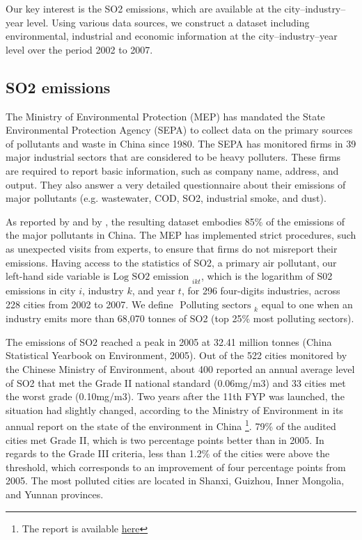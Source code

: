 \documentclass[12pt]{article}
\begin{document}
Our key interest is the SO2 emissions, which are available at the city–industry–year level. Using various data sources, we construct a dataset including environmental, industrial and economic information at the city–industry–year level over the period 2002 to 2007.

\subsection{SO2 emissions} \label{sec:so2}

The Ministry of Environmental Protection (MEP) has mandated the State Environmental Protection Agency (SEPA) to collect data on the primary sources of pollutants and waste in China since 1980. The SEPA has monitored firms in 39 major industrial sectors that are considered to be heavy polluters. These firms are required to report basic information, such as company name, address, and output. They also answer a very detailed questionnaire about their emissions of major pollutants (e.g. wastewater, COD, SO2, industrial smoke, and dust). 

As reported by \cite{Wu2017-bl} and by \cite{Jiang2014-pf}, the resulting dataset embodies 85\% of the emissions of the major pollutants in China. The MEP has implemented strict procedures, such as unexpected visits from experts, to ensure that firms do not misreport their emissions. Having access to the statistics of SO2, a primary air pollutant, our left-hand side variable is $\text {Log SO2 emission }_{i k t}$, which is the logarithm of S02 emissions in city $i$, industry $k$, and year $t$, for 296 four-digits industries, across 228 cities from 2002 to 2007. We define $\text {  Polluting sectors }_{k}$ equal to one when an industry emits more than 68,070 tonnes of SO2 (top 25\% most polluting sectors). 

The emissions of SO2 reached a peak in 2005 at 32.41 million tonnes (China Statistical Yearbook on Environment, 2005). Out of the 522 cities monitored by the Chinese Ministry of Environment, about 400 reported an annual average level of SO2 that met the Grade II national standard (0.06mg/m3) and 33 cities met the worst grade (0.10mg/m3). Two years after the 11th FYP was launched, the situation had slightly changed, according to the Ministry of Environment in its annual report on the state of the environment in China \footnote{The report is available \href{http://english.mee.gov.cn/Resources/Reports/soe/soe2007/201}{here}}. 79\% of the audited cities met Grade II, which is two percentage points better than in 2005. In regards to the Grade III criteria, less than 1.2\% of the cities were above the threshold, which corresponds to an improvement of four percentage points from 2005. The most polluted cities are located in Shanxi, Guizhou, Inner Mongolia, and Yunnan provinces.
\end{document}

